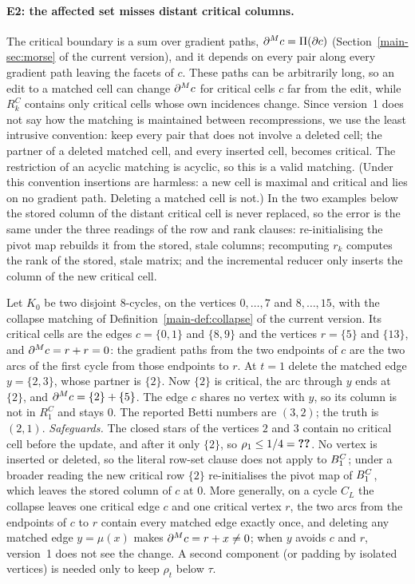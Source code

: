 \paragraph{E2: the affected set misses distant critical columns.}
The critical boundary is a sum over gradient paths, $\partial^{M} c=\Pi(\partial c)$
(Section~\ref{main-sec:morse} of the current version), and it depends on every pair along every gradient
path leaving the facets of $c$. These paths can be arbitrarily long, so an edit
to a matched cell can change $\partial^{M} c$ for critical cells $c$ far from the edit,
while $R_k^C$ contains only critical cells whose own incidences change. Since
version~1 does not say how the matching is maintained between recompressions, we
use the least intrusive convention: keep every pair that does not involve a
deleted cell; the partner of a deleted matched cell, and every inserted cell,
becomes critical. The restriction of an acyclic matching is acyclic, so this is
a valid matching. (Under this convention insertions are harmless: a new cell is
maximal and critical and lies on no gradient path. Deleting a matched cell is
not.) In the two examples below the stored column of the distant critical cell
is never replaced, so the error is the same under the three readings of the row
and rank clauses: re-initialising the pivot map rebuilds it from the stored,
stale columns; recomputing $r_k$ computes the rank of the stored, stale matrix;
and the incremental reducer only inserts the column of the new critical cell.

\begin{example}[E2 on a graph]\label{ex:e2-cycle}
Let $K_0$ be two disjoint $8$-cycles, on the vertices $0,\dots,7$ and
$8,\dots,15$, with the collapse matching of Definition~\ref{main-def:collapse} of the current version. Its
critical cells are the edges $c=\{0,1\}$ and $\{8,9\}$ and the vertices
$r=\{5\}$ and $\{13\}$, and $\partial^{M} c=r+r=0$: the gradient paths from the two
endpoints of $c$ are the two arcs of the first cycle from those endpoints to
$r$. At $t=1$ delete the matched edge $y=\{2,3\}$, whose partner is $\{2\}$. Now
$\{2\}$ is critical, the arc through $y$ ends at $\{2\}$, and
$\partial^{M} c=\{2\}+\{5\}$. The edge $c$ shares no vertex with $y$, so its column is not
in $R_1^C$ and stays $0$. The reported Betti numbers are $(3,2)$; the truth is
$(2,1)$.
\emph{Safeguards.} The closed stars of the vertices $2$ and $3$ contain no
critical cell before the update, and after it only $\{2\}$, so
$\rho_1\le1/4=\textbf{??}$. No vertex is inserted or deleted, so the literal
row-set clause does not apply to $B_{1}^C$; under a broader reading the new
critical row $\{2\}$ re-initialises the pivot map of $B_{1}^C$, which leaves the
stored column of $c$ at $0$.
More generally, on a cycle $C_L$ the collapse leaves one critical edge $c$ and
one critical vertex $r$, the two arcs from the endpoints of $c$ to $r$ contain
every matched edge exactly once, and deleting any matched edge $y=\mu(x)$ makes
$\partial^{M} c=r+x\ne0$; when $y$ avoids $c$ and $r$, version~1 does not see the change.
A second component (or padding by isolated vertices) is needed only to keep
$\rho_t$ below $\tau$.
\end{example}

